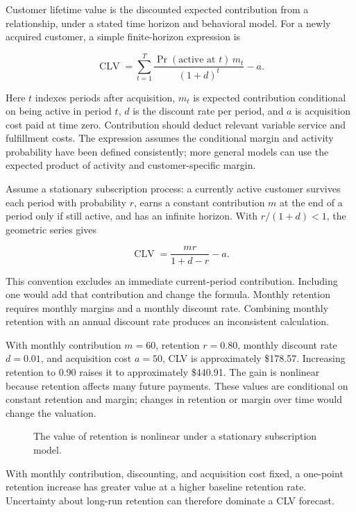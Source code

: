 \noindent Customer lifetime value is the discounted expected contribution from a
relationship, under a stated time horizon and behavioral model. For a
newly acquired customer, a simple finite-horizon expression is

\[
\operatorname{CLV}=\sum_{t=1}^{T}\frac{\Pr(\text{active at }t)\,m_t}{(1+d)^t}-a.
\]

Here \(t\) indexes periods after acquisition, \(m_t\) is expected
contribution conditional on being active in period \(t\), \(d\) is the
discount rate per period, and \(a\) is acquisition cost paid at time
zero. Contribution should deduct relevant variable service and
fulfillment costs. The expression assumes the conditional margin and
activity probability have been defined consistently; more general models
can use the expected product of activity and customer-specific margin.

Assume a stationary subscription process: a currently active customer
survives each period with probability \(r\), earns a constant
contribution \(m\) at the end of a period only if still active, and has
an infinite horizon. With \(r/(1+d)<1\), the geometric series gives

\[
\operatorname{CLV}=\frac{mr}{1+d-r}-a.
\]

This convention excludes an immediate current-period contribution.
Including one would add that contribution and change the formula.
Monthly retention requires monthly margins and a monthly discount rate.
Combining monthly retention with an annual discount rate produces an
inconsistent calculation.

With monthly contribution \(m=60\), retention \(r=0.80\), monthly
discount rate \(d=0.01\), and acquisition cost \(a=50\), CLV is
approximately \$178.57. Increasing retention to 0.90 raises it to
approximately \$440.91. The gain is nonlinear because retention affects
many future payments. These values are conditional on constant retention
and margin; changes in retention or margin over time would change the
valuation.

\begin{figure}[htbp]
\centering

\caption{The value of retention is nonlinear under a stationary subscription model.}\label{fig:M04_clv}
\end{figure}

With monthly contribution, discounting, and acquisition cost fixed, a
one-point retention increase has greater value at a higher baseline
retention rate. Uncertainty about long-run retention can therefore
dominate a CLV forecast.

